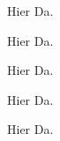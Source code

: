 \documentclass{article}
\begin{document}
Hier \blindtext Da.

Hier \blindtext Da.

Hier \blindtext Da.

Hier \blindtext Da.

Hier \blindtext Da.
\end{document}
